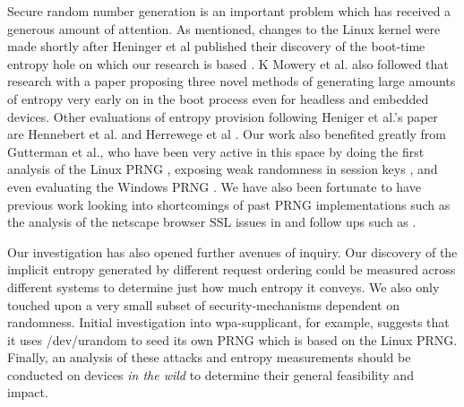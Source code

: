 Secure random number generation is an important problem which has received a generous amount of attention.  As mentioned, changes to the Linux kernel were made shortly after Heninger et al published their discovery of the boot-time entropy hole on which our research is based \cite{pnqs}.  K Mowery et al. also followed that research with a paper proposing three novel methods of generating large amounts of entropy very early on in the boot process even for headless and embedded devices\cite{kmowery}.  Other evaluations of entropy provision following Heniger et al.'s paper are Hennebert et al. \cite{2013_entropy} and Herrewege et al \cite{vansecure}.  Our work also benefited greatly from Gutterman et al., who have been very active in this space by doing the first analysis of the Linux PRNG \cite{linuxPRNG}, exposing weak randomness in session keys \cite{java_sessid}, and even evaluating the Windows PRNG \cite{windows}.  We have also been fortunate to have previous work looking into shortcomings of past PRNG implementations such as the analysis of the netscape browser SSL issues in \cite{netscape} and follow ups such as \cite{yilek}.

Our investigation has also opened further avenues of inquiry.  Our discovery of the implicit entropy generated by different request ordering could be measured across different systems to determine just how much entropy it conveys.  We also only touched upon a very small subset of security-mechanisms dependent on randomness.  Initial investigation into wpa-supplicant, for example, suggests that it uses /dev/urandom to seed its own PRNG which is based on the Linux PRNG.  Finally, an analysis of these attacks and entropy measurements should be conducted on devices \textit{in the wild} to determine their general feasibility and impact.
